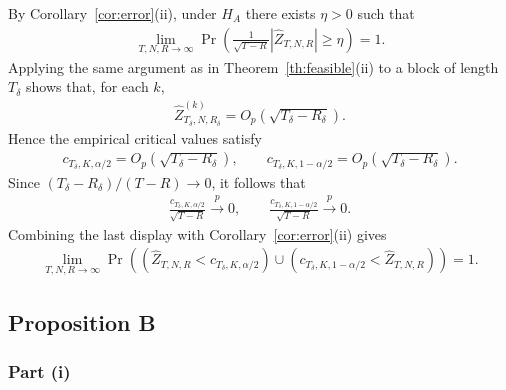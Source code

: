 By Corollary~\ref{cor:error}(ii), under $H_A$ there exists $\eta>0$ such that
\begin{align*}
\lim_{T,N,R\rightarrow \infty }
\Pr \left( \frac{1}{\sqrt{T-R}}\left\vert \widehat{Z}_{T,N,R}\right\vert \geq \eta \right)=1.
\end{align*}
Applying the same argument as in Theorem~\ref{th:feasible}(ii) to a block of
length $T_\delta$ shows that, for each $k$,
\begin{align*}
\widehat{Z}_{T_\delta,N,R_\delta}^{(k)} = O_p\!\left( \sqrt{T_\delta-R_\delta}\right).
\end{align*}
Hence the empirical critical values satisfy
\begin{align*}
c_{T_\delta,K,\alpha/2} = O_p\!\left( \sqrt{T_\delta-R_\delta}\right),
\qquad
c_{T_\delta,K,1-\alpha/2} = O_p\!\left( \sqrt{T_\delta-R_\delta}\right).
\end{align*}
Since $(T_\delta-R_\delta)/(T-R)\rightarrow 0$, it follows that
\begin{align*}
\frac{c_{T_\delta,K,\alpha/2}}{\sqrt{T-R}}\overset{p}{\rightarrow}0,
\qquad
\frac{c_{T_\delta,K,1-\alpha/2}}{\sqrt{T-R}}\overset{p}{\rightarrow}0.
\end{align*}
Combining the last display with Corollary~\ref{cor:error}(ii) gives
\begin{align*}
\lim_{T,N,R\rightarrow \infty }
\Pr \left( \left( \widehat{Z}_{T,N,R}<c_{T_\delta,K,\alpha/2}\right)
\cup \left( c_{T_\delta,K,1-\alpha/2}<\widehat{Z}_{T,N,R}\right) \right)=1.
\end{align*}


\subsection{Proposition B}

\subsubsection{Part (i)}

